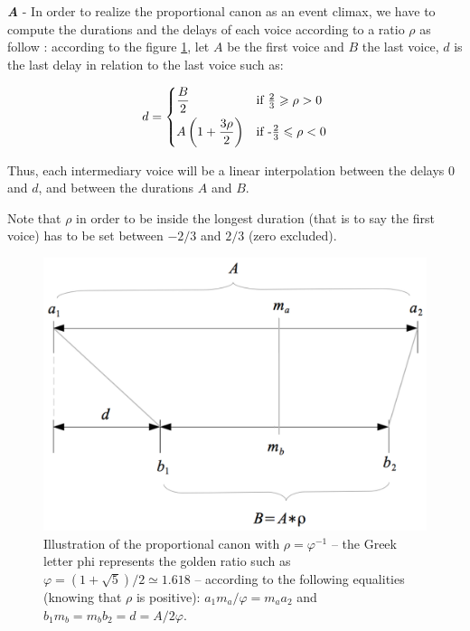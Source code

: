 \textbf{\textit{A}} - In order to realize the proportional canon as an event climax, we have to compute the durations and the delays of each voice according to a ratio $\rho$ as follow : according to the figure \ref{canon}, let $A$ be the first voice and $B$ the last voice, $d$ is the last delay in relation to the last voice such as:
  
\[
     d =
\begin{dcases}
	\frac{B}{2}  & \text{if } \tfrac{2}{3} \geqslant \rho > 0\\
	A \left ( 1+ \frac{3\rho}{2} \right )  & \text{if } \text{-} \tfrac{2}{3} \leqslant \rho < 0
   \end{dcases}
\]

  \noindent Thus, each intermediary voice will be a linear interpolation between the delays $0$ and $d$, and between the durations $A$ and $B$.
  
  Note that $\rho$ in order to be inside the longest duration (that is to say the first voice) has to be set between $-2/3$ and $2/3$ (zero excluded).
  
\begin{figure}[h]
\begin{center}
\includegraphics[scale=0.4]{img/3499}
\caption{Illustration of the proportional canon with $\rho = \varphi ^{-1}$ -- the Greek letter phi represents the golden ratio such as $\varphi = (1+ \sqrt 5)/2 \simeq 1.618$ -- according to the following equalities (knowing that $\rho$ is positive): $a_1m_a/ \varphi =m_aa_2$ and $ b_1m_b=m_bb_2=d=A/2 \varphi$.}
\label{canon}
\end{center}
\end{figure}
  
